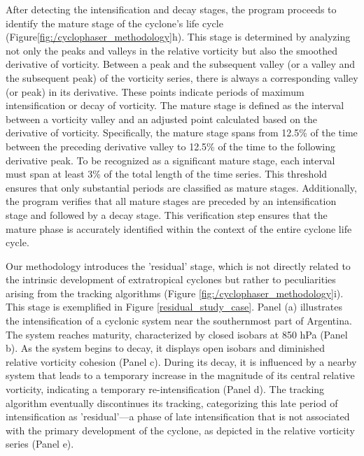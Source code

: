 After detecting the intensification and decay stages, the program proceeds to identify the mature stage of the cyclone's life cycle (Figure\ref{fig:/cyclophaser_methodology}h). This stage is determined by analyzing not only the peaks and valleys in the relative vorticity but also the smoothed derivative of vorticity. Between a peak and the subsequent valley (or a valley and the subsequent peak) of the vorticity series, there is always a corresponding valley (or peak) in its derivative. These points indicate periods of maximum intensification or decay of vorticity. The mature stage is defined as the interval between a vorticity valley and an adjusted point calculated based on the derivative of vorticity. Specifically, the mature stage spans from 12.5\% of the time between the preceding derivative valley to 12.5\% of the time to the following derivative peak. To be recognized as a significant mature stage, each interval must span at least 3\% of the total length of the time series. This threshold ensures that only substantial periods are classified as mature stages. Additionally, the program verifies that all mature stages are preceded by an intensification stage and followed by a decay stage. This verification step ensures that the mature phase is accurately identified within the context of the entire cyclone life cycle.

Our methodology introduces the 'residual' stage, which is not directly related to the intrinsic development of extratropical cyclones but rather to peculiarities arising from the tracking algorithms (Figure \ref{fig:/cyclophaser_methodology}i). This stage is exemplified in Figure \ref{residual_study_case}. Panel (a) illustrates the intensification of a cyclonic system near the southernmost part of Argentina. The system reaches maturity, characterized by closed isobars at 850 hPa (Panel b). As the system begins to decay, it displays open isobars and diminished relative vorticity cohesion (Panel c). During its decay, it is influenced by a nearby system that leads to a temporary increase in the magnitude of its central relative vorticity, indicating a temporary re-intensification (Panel d). The tracking algorithm eventually discontinues its tracking, categorizing this late period of intensification as 'residual'—a phase of late intensification that is not associated with the primary development of the cyclone, as depicted in the relative vorticity series (Panel e).

